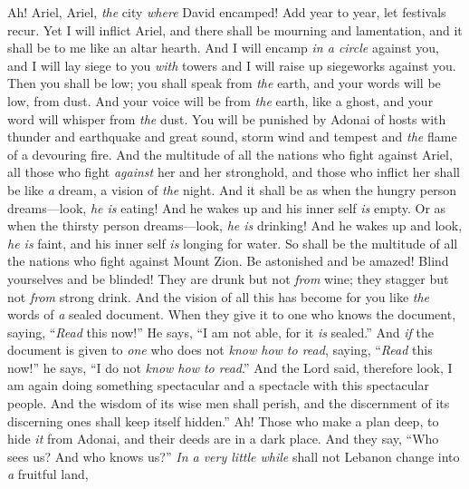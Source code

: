 \begin{biblechapter} %
 Ah! Ariel, Ariel, \textit{the} city \textit{where} David encamped!
\verse Add year to year, 
let festivals recur.
\verse Yet I will inflict Ariel, 
and there shall be mourning and lamentation, 
and it shall be to me like an altar hearth.
\verse And I will encamp \textit{in a circle} against you, 
and I will lay siege to you \textit{with} towers 
and I will raise up siegeworks against you.
\verse Then you shall be low; 
you shall speak from \textit{the} earth, 
and your words will be low, from dust. 
And your voice will be from \textit{the} earth, like a ghost, 
and your word will whisper from \textit{the} dust.
\verse You will be punished by Adonai of hosts
\verse with thunder and earthquake and great sound, 
storm wind and tempest and \textit{the} flame of a devouring fire.
\verse And the multitude of all the nations who fight against Ariel, 
all those who fight \textit{against} her and her stronghold, 
and those who inflict her shall be like \textit{a} dream, a vision of \textit{the} night.
\verse And it shall be as when the hungry person dreams—look, \textit{he is} eating! 
And he wakes up and his inner self \textit{is} empty. 
Or as when the thirsty person dreams—look, \textit{he is} drinking! 
And he wakes up and look, \textit{he is} faint, 
and his inner self \textit{is} longing for water. 
So shall be the multitude of all the nations who fight against Mount Zion.
\verse Be astonished and be amazed! 
Blind yourselves and be blinded! 
They are drunk but not \textit{from} wine; 
they stagger but not \textit{from} strong drink.
\verse And the vision of all this has become for you like \textit{the} words of \textit{a} sealed document. When they give it to one who knows the document, saying, “\textit{Read} this now!” He says, “I am not able, for it \textit{is} sealed.”
\verse And \textit{if} the document is given to \textit{one} who does not \textit{know how to read}, saying, “\textit{Read} this now!” he says, “I do not \textit{know how to read}.”
\verse And the Lord said,
\verse therefore look, I am again doing something spectacular
\verse and a spectacle with this spectacular people. 
And the wisdom of its wise men shall perish, 
and the discernment of its discerning ones shall keep itself hidden.”
\verse Ah! Those who make a plan deep, to hide \textit{it} from Adonai, 
and their deeds are in a dark place. 
And they say, “Who sees us? 
And who knows us?”
 \textit{In a very little while} shall not Lebanon change into \textit{a} fruitful land, 

\end{biblechapter}
